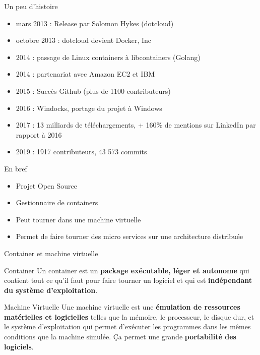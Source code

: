 \begin{frame}{Un peu d'histoire}
    \begin{itemize}
        \item mars 2013 : Release par Solomon Hykes (dotcloud)
        \item octobre 2013 : dotcloud devient Docker, Inc
        \item 2014 : passage de Linux containers à libcontainers (Golang)
        \item 2014 : partenariat avec Amazon EC2 et IBM
        \item 2015 : Succès Github (plus de 1100 contributeurs)
        \item 2016 : Windocks, portage du projet à Windows 
        \item 2017 : 13 milliards de téléchargements, + 160\% de mentions sur LinkedIn par rapport à 2016
        \item 2019 : 1917 contributeurs, 43 573 commits
    \end{itemize}
\end{frame}

\begin{frame}{En bref}
    \begin{itemize}
        \item Projet Open Source
        \item Gestionnaire de containers
        \item Peut tourner dans une machine virtuelle
        \item Permet de faire tourner des micro services sur une architecture distribuée
    \end{itemize}
\end{frame}

\begin{frame}{Container et machine virtuelle}
    \begin{block}{Container}
         Un container est un \textbf{package exécutable, léger et autonome} qui contient tout ce qu'il faut pour faire tourner un logiciel et qui est \textbf{indépendant du système d'exploitation}.
    \end{block}
    
    \begin{block}{Machine Virtuelle}
         Une machine virtuelle est une \textbf{émulation de ressources matérielles et logicielles} telles que la mémoire, le processeur, le disque dur, et le système d'exploitation qui permet d'exécuter les programmes dans les mêmes conditions que la machine simulée. Ça permet une grande \textbf{portabilité des logiciels}.
    \end{block}
\end{frame}


